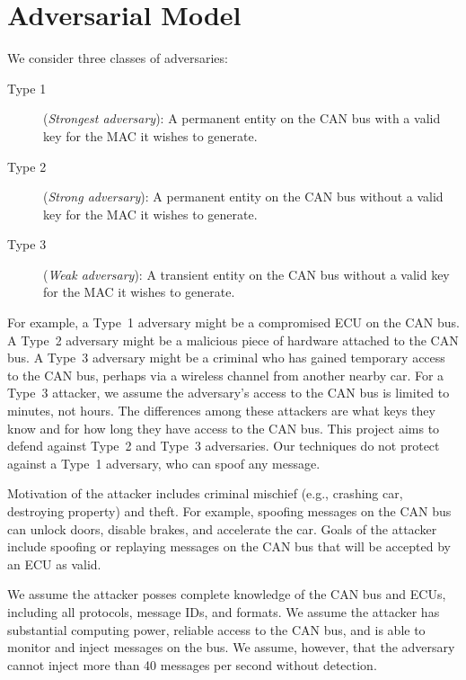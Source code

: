 \section{Adversarial Model}
\label{adversary}

We consider three classes of adversaries:

\begin{description}

	\item [Type 1]
	(\textit{Strongest adversary}): A permanent entity on the CAN bus with a valid key for the MAC it wishes to generate.
	
	\item [Type 2]
	(\textit{Strong adversary}): A permanent entity on the CAN bus without a valid key for the MAC it wishes to generate.
	
	\item [Type 3]
	(\textit{Weak adversary}): A transient entity on the CAN bus without a valid key for the MAC it wishes to generate.
	
\end{description}

For example, a Type~1 adversary might be a compromised ECU on the CAN bus.  A Type~2 adversary might be a malicious piece of hardware attached
to the CAN bus.  A Type~3 adversary might be a criminal who has gained temporary access to the CAN bus, perhaps via a wireless channel from
another nearby car.  For a Type~3 attacker, we assume the adversary's access to the CAN bus is limited to minutes, not hours.  
The differences among these attackers are what keys they know and for how long they have access to the CAN bus.
This project aims to defend against Type~2 and Type~3 adversaries.   Our techniques do not protect against 
a Type~1 adversary, who can spoof any message. 

Motivation of the attacker includes criminal mischief (e.g., crashing car, destroying property) and theft.  
For example, spoofing messages on the CAN bus can unlock doors, disable brakes, and accelerate the car.
Goals of the attacker include spoofing or replaying messages on the CAN bus that will be accepted by an ECU
as valid.

We assume the attacker posses complete knowledge of the CAN bus and ECUs, including all protocols, message IDs, and formats.
We assume the attacker has substantial computing power, reliable access to the CAN bus, and is able to 
monitor and inject messages on the bus.  We assume, however, that the adversary cannot inject more than 40 messages
per second without detection.

